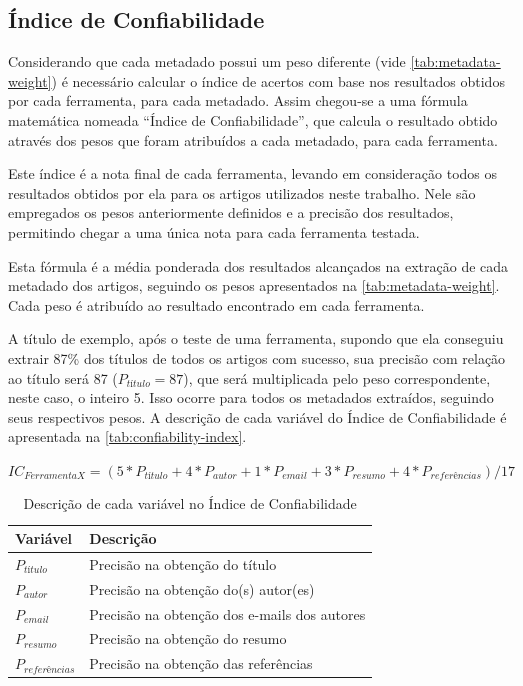 \subsection{Índice de Confiabilidade}
\label{ssec:confiability-index}


Considerando que cada metadado possui um peso diferente (vide \autoref{tab:metadata-weight}) é necessário calcular o índice de acertos com base nos resultados obtidos por cada ferramenta, para cada metadado. Assim chegou-se a uma fórmula matemática nomeada ``Índice de Confiabilidade'', que calcula o resultado obtido através dos pesos que foram atribuídos a cada metadado, para cada ferramenta. 

Este índice é a nota final de cada ferramenta, levando em consideração todos os resultados obtidos por ela para os artigos utilizados neste trabalho. Nele são empregados os pesos anteriormente definidos e a precisão dos resultados, permitindo chegar a uma única nota para cada ferramenta testada.

Esta fórmula é a média ponderada dos resultados alcançados na extração de cada metadado dos artigos, seguindo os pesos apresentados na \autoref{tab:metadata-weight}. Cada peso é atribuído ao resultado encontrado em cada ferramenta. 

A título de exemplo, após o teste de uma ferramenta, supondo que ela conseguiu extrair 87\% dos títulos de todos os artigos com sucesso, sua precisão com relação ao título será 87 ($P_{título}=87$), que será multiplicada pelo peso correspondente, neste caso, o inteiro 5. Isso ocorre para todos os metadados extraídos, seguindo seus respectivos pesos. A descrição de cada variável do Índice de Confiabilidade é apresentada na \autoref{tab:confiability-index}.

\begin{center}
    $ IC_{Ferramenta X}=(5*P_{título}+4*P_{autor}+1*P_{email}+3*P_{resumo}+4*P_{referências}) / 17 $
\end{center}

\begin{table}[h!]
    \caption{Descrição de cada variável no Índice de Confiabilidade}
    \begin{center}
        \begin{tabular}{|p{3cm}|p{8cm}|}
            \hline \textbf{Variável} & \textbf{Descrição}\\ 
            \hline $P_{título}$ & Precisão na obtenção do título \\
            \hline $P_{autor}$ & Precisão na obtenção do(s) autor(es)\\
            \hline $P_{email}$ & Precisão na obtenção dos e-mails dos autores \\
            \hline $P_{resumo}$ & Precisão na obtenção do resumo \\
            \hline $P_{referências}$ & Precisão na obtenção das referências \\
            \hline 
        \end{tabular} 
    \end{center}
    \label{tab:confiability-index}
\end{table}


